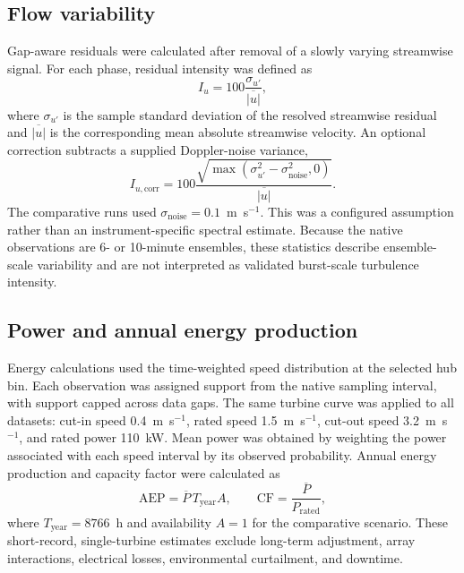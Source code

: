 \documentclass[12pt,sort&compress]{elsarticle}
\begin{document}
\subsection{Flow variability}
\label{subsec:variability-method}

Gap-aware residuals were calculated after removal of a slowly varying streamwise signal. For each phase, residual intensity was defined as
\begin{equation}
I_u=100\frac{\sigma_{u'}}{\overline{|u|}},
\label{eq:residual-intensity}
\end{equation}
where $\sigma_{u'}$ is the sample standard deviation of the resolved streamwise residual and $\overline{|u|}$ is the corresponding mean absolute streamwise velocity. An optional correction subtracts a supplied Doppler-noise variance,
\begin{equation}
I_{u,\mathrm{corr}}=100\frac{\sqrt{\max(\sigma_{u'}^2-\sigma_{\mathrm{noise}}^2,0)}}{\overline{|u|}}.
\label{eq:noise-correction}
\end{equation}
The comparative runs used $\sigma_{\mathrm{noise}}=0.1$~m~s$^{-1}$. This was a configured assumption rather than an instrument-specific spectral estimate. Because the native observations are 6- or 10-minute ensembles, these statistics describe ensemble-scale variability and are not interpreted as validated burst-scale turbulence intensity.

\subsection{Power and annual energy production}
\label{subsec:energy-method}

Energy calculations used the time-weighted speed distribution at the selected hub bin. Each observation was assigned support from the native sampling interval, with support capped across data gaps. The same turbine curve was applied to all datasets: cut-in speed 0.4~m~s$^{-1}$, rated speed 1.5~m~s$^{-1}$, cut-out speed 3.2~m~s$^{-1}$, and rated power 110~kW. Mean power was obtained by weighting the power associated with each speed interval by its observed probability. Annual energy production and capacity factor were calculated as
\begin{equation}
\mathrm{AEP}=\overline{P}\,T_{\mathrm{year}}A,
\qquad
\mathrm{CF}=\frac{\overline{P}}{P_{\mathrm{rated}}},
\label{eq:aep}
\end{equation}
where $T_{\mathrm{year}}=8766$~h and availability $A=1$ for the comparative scenario. These short-record, single-turbine estimates exclude long-term adjustment, array interactions, electrical losses, environmental curtailment, and downtime.
\end{document}
